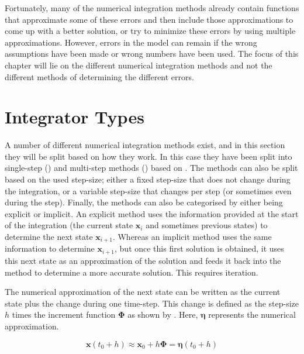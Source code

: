Fortunately, many of the numerical integration methods already contain functions that approximate some of these errors and then include those approximations to come up with a better solution, or try to minimize these errors by using multiple approximations. However, errors in the model can remain if the wrong assumptions have been made or wrong numbers have been used. The focus of this chapter will lie on the different numerical integration methods and not the different methods of determining the different errors.

\section{Integrator Types}
\label{sec:differentIntegratorTypes}
A number of different numerical integration methods exist, and in this section they will be split based on how they work. In this case they have been split into single-step () and multi-step methods () based on \cite{noomen2013int}. The methods can also be split based on the used step-size; either a fixed step-size that does not change during the integration, or a variable step-size that changes per step (or sometimes even during the step). Finally, the methods can also be categorised by either being explicit or implicit. An explicit method uses the information provided at the start of the integration (the current state $\mathbf{x}_{i}$ and sometimes previous states) to determine the next state $\mathbf{x}_{i+1}$. Whereas an implicit method uses the same information to determine $\mathbf{x}_{i+1}$, but once this first solution is obtained, it uses this next state as an approximation of the solution and feeds it back into the method to determine a more accurate solution. This requires iteration. 

The numerical approximation of the next state can be written as the current state plus the change during one time-step. This change is defined as the step-size $h$ times the increment function 
$\mathbf{\Phi}$ as shown by . Here, $\mathbf{\eta}$ represents the numerical approximation. 



\begin{equation} \label{eq:integration}
\mathbf{x}(t_{0}+h)\approx\mathbf{x}_{0}+h\bm{\Phi}=\mathbf{\eta}(t_{0}+h)
\end{equation}

